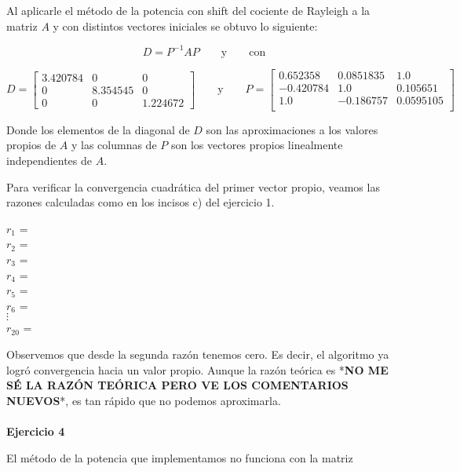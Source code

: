\documentclass[11pt]{article}
\begin{document}
\noindent
Al aplicarle el método de la potencia con shift del cociente de Rayleigh a la matriz $A$ y con distintos vectores iniciales se obtuvo lo siguiente:

\[
 D = P^{-1}AP
 \qquad\text{y}\qquad
\text{con}
 \]

\[
 D =
 \begin{bmatrix}
 3.420784 & 0 & 0 \\
 0 & 8.354545 & 0 \\
 0 & 0 & 1.224672
\end{bmatrix}
 \qquad\text{y}\qquad
P =
 \begin{bmatrix}
  0.652358 &  0.0851835 & 1.0      \\
 -0.420784  & 1.0    &    0.105651 \\
  1.0     &  -0.186757 &  0.0595105 \\
\end{bmatrix}
 \]

Donde los elementos de la diagonal de $D$ son las aproximaciones a los valores propios de $A$ y las columnas de $P$ son los vectores propios linealmente independientes de $A$.

Para verificar la convergencia cuadrática del primer vector propio, veamos las razones calculadas como en los incisos c) del ejercicio 1.

\begin{multicols}{3}
\noindent
$ r_{1} $ =  \\
$ r_{2} $ =  \\
$ r_{3} $ =  \\
$ r_{4} $ =  \\
$ r_{5} $ =  \\
$ r_{6} $ =  \\
$ \vdots $ \\
$ r_{20} $ =  \\
\end{multicols}

Observemos que desde la segunda razón tenemos cero. Es decir, el algoritmo
ya logró convergencia hacia un valor propio. Aunque la razón teórica es
*\textbf{NO ME SÉ LA RAZÓN TEÓRICA PERO VE LOS COMENTARIOS NUEVOS}*, es tan
rápido que no podemos aproximarla.
\\
\\

\noindent
\textbf{Ejercicio 4}

\noindent
El método de la potencia que implementamos no funciona con la matriz
\end{document}
